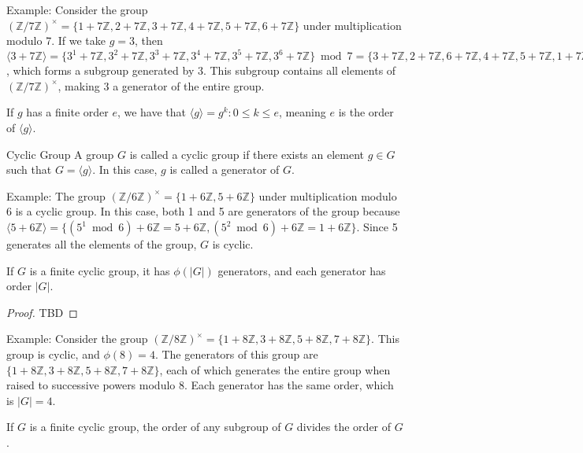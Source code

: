 \documentclass{article}
\begin{document}
Example: Consider the group $(\mathbb{Z}/7\mathbb{Z})^{\times} = \{1+ 7\mathbb{Z}, 2+ 7\mathbb{Z}, 3+ 7\mathbb{Z}, 4+ 7\mathbb{Z}, 5+ 7\mathbb{Z}, 6+ 7\mathbb{Z}\}$ under multiplication modulo 7. If we take $g = 3$, then $\langle 3 +7\mathbb{Z} \rangle = \{3^1+7\mathbb{Z}, 3^2+7\mathbb{Z}, 3^3+7\mathbb{Z}, 3^4+7\mathbb{Z}, 3^5+7\mathbb{Z}, 3^6+7\mathbb{Z}\} \bmod 7 = \{3+7\mathbb{Z}, 2+7\mathbb{Z}, 6+7\mathbb{Z}, 4+7\mathbb{Z}, 5+7\mathbb{Z}, 1+7\mathbb{Z}\}$, which forms a subgroup generated by 3. This subgroup contains all elements of $(\mathbb{Z}/7\mathbb{Z})^{\times}$, making 3 a generator of the entire group.

If $g$ has a finite order $e$, we have that $\langle g \rangle = {g^{k}: 0 \leq k \leq e}$, meaning $e$ is the order of $\langle g \rangle$.

\begin{definition}{Cyclic Group}{} A group $G$ is called a cyclic group if there exists an element $g \in G$ such that $G = \langle g \rangle$. In this case, $g$ is called a generator of $G$. \end{definition}

Example: The group $(\mathbb{Z}/6\mathbb{Z})^{\times} = \{1+6\mathbb{Z}, 5+6\mathbb{Z}\}$ under multiplication modulo 6 is a cyclic group. In this case, both 1 and 5 are generators of the group because $\langle 5 +6\mathbb{Z} \rangle = \{(5^1 \bmod 6)+6\mathbb{Z} = 5 +6\mathbb{Z}, (5^2 \bmod 6)+6\mathbb{Z} = 1+6\mathbb{Z}\}$. Since 5 generates all the elements of the group, $G$ is cyclic.

\begin{theorem}{}{} If $G$ is a finite cyclic group, it has $\phi(|G|)$ generators, and each generator has order $|G|$. \end{theorem}

\begin{proof}
    TBD
\end{proof}

Example: Consider the group $(\mathbb{Z}/8\mathbb{Z})^{\times} = \{1+8\mathbb{Z}, 3+8\mathbb{Z}, 5+8\mathbb{Z}, 7+8\mathbb{Z}\}$. This group is cyclic, and $\phi(8) = 4$. The generators of this group are $\{1+8\mathbb{Z}, 3+8\mathbb{Z}, 5+8\mathbb{Z}, 7+8\mathbb{Z}\}$, each of which generates the entire group when raised to successive powers modulo 8. Each generator has the same order, which is $|G| = 4$.

\begin{theorem}{}{} If $G$ is a finite cyclic group, the order of any subgroup of $G$ divides the order of $G$. \end{theorem}
\end{document}
